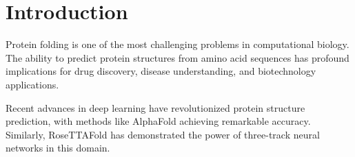 
\section{Introduction}

Protein folding is one of the most challenging problems in computational biology. The ability to predict protein structures from amino acid sequences has profound implications for drug discovery, disease understanding, and biotechnology applications.

Recent advances in deep learning have revolutionized protein structure prediction, with methods like AlphaFold \cite{jumper2021highly} achieving remarkable accuracy. Similarly, RoseTTAFold \cite{baek2021accurate} has demonstrated the power of three-track neural networks in this domain.

%
%
%
